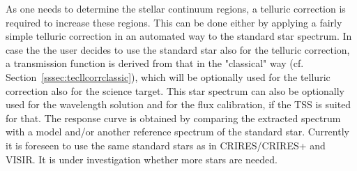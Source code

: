 As one needs to determine the stellar continuum regions, a telluric correction is required to increase these regions. This can be done either by applying a fairly simple telluric correction in an automated way to the standard star spectrum. In case the the user decides to use the standard star also for the telluric correction, a transmission function is derived from that in the "classical" way (cf. Section~\ref{sssec:tecllcorrclassic}), which will be optionally used for the telluric correction also for the science target. This star spectrum can also be optionally used for the wavelength solution and for the flux calibration, if the \ac{TSS} is suited for that. The response curve is obtained by comparing the extracted spectrum with a model and/or another reference spectrum of the standard star. Currently it is foreseen to use the same standard stars as in \ac{CRIRES}/CRIRES+ and \ac{VISIR}. It is under investigation whether more stars are needed.
